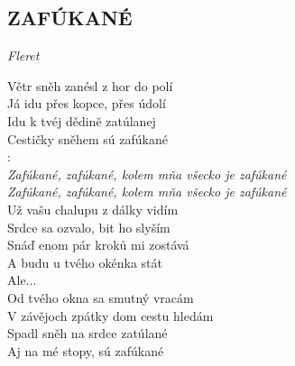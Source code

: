 \begin{flushleft}
	\section*{\Huge ZAFÚKANÉ}
	\emph{Fleret}
\end{flushleft}

Větr sněh zanésl z hor do polí\\
Já idu přes kopce, přes údolí\\
Idu k tvéj dědině zatúlanej\\
Cestičky sněhem sú zafúkané \hspace{0.6cm}  \hspace{1.7cm}  \hspace{1.1cm} \\

\textregistered:\\
\emph{
Zafúkané, zafúkané, kolem mňa všecko je zafúkané\\
Zafúkané, zafúkané, kolem mňa všecko je zafúkané}\\

Už vašu chalupu z dálky vidím\\
Srdce sa ozvalo, bit ho slyším\\
Snáď enom pár kroků mi zostává\\
A budu u tvého okénka stát\\

Ale... \textregistered\\

Od tvého okna sa smutný vracám\\
V závějoch zpátky dom cestu hledám\\
Spadl sněh na srdce zatúlané\\
Aj na mé stopy, sú zafúkané\\

\textregistered

\newpage
